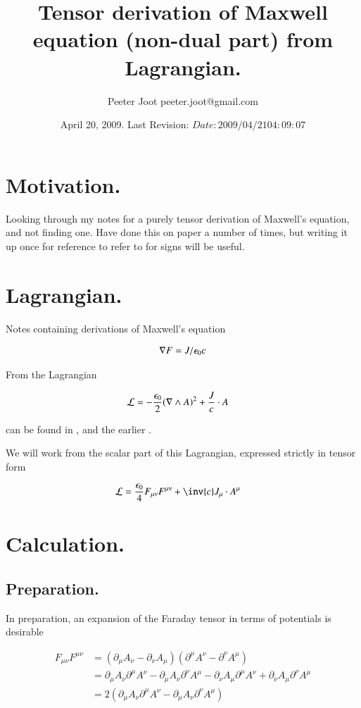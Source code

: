 \documentclass{article}
\title{ Tensor derivation of Maxwell equation (non-dual part) from Lagrangian. }
\author{Peeter Joot \quad peeter.joot@gmail.com }
\date{ April 20, 2009.  Last Revision: $Date: 2009/04/21 04:09:07 $ }
\begin{document}
\maketitle{}
\tableofcontents
\section{ Motivation. }

Looking through my notes for a purely tensor derivation of Maxwell's equation, and not finding one.  Have done this on
paper a number of times, but writing it up once for reference to refer to for signs will be useful.

\section{ Lagrangian. }

Notes containing derivations of Maxwell's equation

\begin{align}\label{eqn:maxwell}
\nabla F = J/\epsilon_0 c
\end{align}

From the Lagrangian

\begin{align}\label{eqn:maxlag}
\mathcal{L} &= -\frac{\epsilon_0}{2} (\nabla \wedge A)^2 + \frac{J}{c} \cdot A
\end{align}

can be found in \cite{PJFieldLagrangian}, and the earlier \cite{PJMaxwellLagrangian}.

We will work from the scalar part of this Lagrangian, expressed strictly in tensor form

\begin{align}
\LL &= \frac{\epsilon_0}{4} F_{\mu\nu}F^{\mu\nu} + \inv{c} J_\mu \cdot A^\mu
\end{align}

\section{ Calculation. }

\subsection{ Preparation. }

In preparation, an expansion of the Faraday tensor in terms of potentials is desirable

\begin{align*}
F_{\mu\nu}F^{\mu\nu}
&=
(\partial_\mu A_\nu - \partial_\nu A_\mu) (\partial^\mu A^\nu - \partial^\nu A^\mu) \\
&=
\partial_\mu A_\nu \partial^\mu A^\nu 
-\partial_\mu A_\nu \partial^\nu A^\mu
- \partial_\nu A_\mu \partial^\mu A^\nu 
+ \partial_\nu A_\mu \partial^\nu A^\mu \\
&=
2 (\partial_\mu A_\nu \partial^\mu A^\nu - \partial_\mu A_\nu \partial^\nu A^\mu)
\\
\end{align*}
\end{document}
